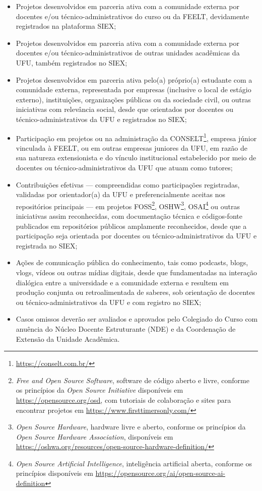 \begin{itemize}
\item Projetos desenvolvidos em parceria ativa com a comunidade externa por docentes e/ou técnico-administrativos do curso ou da FEELT, devidamente registrados na plataforma SIEX;
\item Projetos desenvolvidos em parceria ativa com a comunidade externa por docentes e/ou técnico-administrativos de outras unidades acadêmicas da UFU, também registrados no SIEX;
\item Projetos desenvolvidos em parceria ativa pelo(a) próprio(a) estudante com a comunidade externa, representada por empresas (inclusive o local de estágio externo), instituições, organizações públicas ou da sociedade civil, ou outras iniciativas com relevância social, desde que orientados por docentes ou técnico-administrativos da UFU e registrados no SIEX;
\item Participação em projetos ou na administração da CONSELT\footnote{\url{https://conselt.com.br/}}, empresa júnior vinculada à FEELT, ou em outras empresas juniores da UFU, em razão de sua natureza extensionista e do vínculo institucional estabelecido por meio de docentes ou técnico-administrativos da UFU que atuam como tutores;
\item Contribuições efetivas — compreendidas como participações registradas, validadas por orientador(a) da UFU e preferencialmente aceitas nos repositórios principais — em projetos FOSS\footnote{\textit{Free and Open Source Software}, software de código aberto e livre, conforme os princípios da \textit{Open Source Initiative} disponíveis em \url{https://opensource.org/osd}, com tutoriais de colaboração e sites para encontrar projetos em \url{https://www.firsttimersonly.com/}}, OSHW\footnote{\textit{Open Source Hardware}, hardware livre e aberto, conforme os princípios da \textit{Open Source Hardware Association}, disponíveis em \url{https://oshwa.org/resources/open-source-hardware-definition/}}, OSAI\footnote{\textit{Open Source Artificial Intelligence}, inteligência artificial aberta, conforme os princípios disponíveis em \url{https://opensource.org/ai/open-source-ai-definition}} ou outras iniciativas assim reconhecidas, com documentação técnica e códigos-fonte publicados em repositórios públicos amplamente reconhecidos, desde que a participação seja orientada por docentes ou técnico-administrativos da UFU e registrada no SIEX;
\item Ações de comunicação pública do conhecimento, tais como podcasts, blogs, vlogs, vídeos ou outras mídias digitais, desde que fundamentadas na interação dialógica entre a universidade e a comunidade externa e resultem em produção conjunta ou retroalimentada de saberes, sob orientação de docentes ou técnico-administrativos da UFU e com registro no SIEX;
\item Casos omissos deverão ser avaliados e aprovados pelo Colegiado do Curso com anuência do Núcleo Docente Estruturante (NDE) e da Coordenação de Extensão da Unidade Acadêmica.
\end{itemize}

